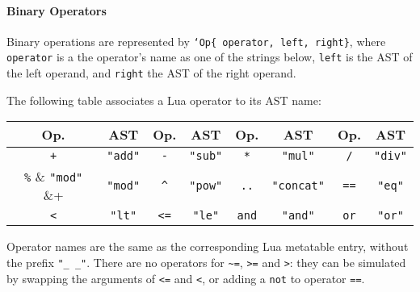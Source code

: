 \paragraph{Binary Operators}
Binary operations are represented by {\tt`Op\{ operator, left,
  right\}}, where \verb+operator+ is a the operator's name as one of
the strings below, \verb+left+ is the AST of the left operand, and
\verb+right+ the AST of the right operand.

The following table associates a Lua operator to its AST name:

\begin{center}
\begin{tabular}{|c|c||c|c||c|c||c|c|}
  \hline
  \bf Op. & \bf AST &
  \bf Op. & \bf AST &
  \bf Op. & \bf AST &
  \bf Op. & \bf AST \\

  \hline\hline %
  \verb|+|   & \verb+"add"+    &
  \verb+-+   & \verb+"sub"+    &
  \verb+*+   & \verb+"mul"+    &
  \verb+/+   & \verb+"div"+    \\
  \hline %
  \verb+%+   & \verb+"mod"+    &
  \verb+^+   & \verb+"pow"+    &
  \verb+..+  & \verb+"concat"+ &
  \verb+==+  & \verb+"eq"+     \\
  \hline %
  \verb+<+   & \verb+"lt"+     &
  \verb+<=+  & \verb+"le"+     &
  \verb+and+ & \verb+"and"+    &
  \verb+or+  & \verb+"or"+     \\
  \hline %
\end{tabular}
\end{center}

Operator names are the same as the corresponding Lua metatable entry,
without the prefix {\tt"\_\,\_"}. There are no operators for
\verb+~=+, \verb+>=+ and \verb+>+: they can be simulated by swapping
the arguments of \verb+<=+ and \verb+<+, or adding a \verb+not+ to
operator \verb+==+.

